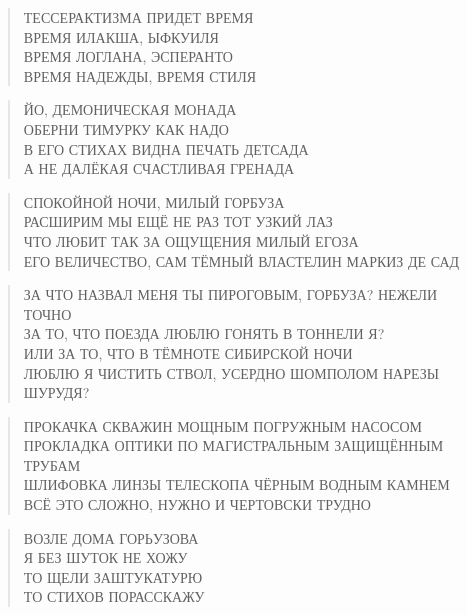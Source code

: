 \poemtitle{***}
\begin{verse}
ТЕССЕРАКТИЗМА ПРИДЕТ ВРЕМЯ\\
ВРЕМЯ ИЛАКША, ЫФКУИЛЯ\\
ВРЕМЯ ЛОГЛАНА, ЭСПЕРАНТО\\
ВРЕМЯ НАДЕЖДЫ, ВРЕМЯ СТИЛЯ
\end{verse}

\poemtitle{***}
\begin{verse}
ЙО, ДЕМОНИЧЕСКАЯ МОНАДА\\
ОБЕРНИ ТИМУРКУ КАК НАДО\\
В ЕГО СТИХАХ ВИДНА ПЕЧАТЬ ДЕТСАДА\\
А НЕ ДАЛЁКАЯ СЧАСТЛИВАЯ ГРЕНАДА
\end{verse}

\poemtitle{***}
\begin{verse}
СПОКОЙНОЙ НОЧИ, МИЛЫЙ ГОРБУЗА\\
РАСШИРИМ МЫ ЕЩЁ НЕ РАЗ ТОТ УЗКИЙ ЛАЗ\\
ЧТО ЛЮБИТ ТАК ЗА ОЩУЩЕНИЯ МИЛЫЙ ЕГОЗА\\
ЕГО ВЕЛИЧЕСТВО, САМ ТЁМНЫЙ ВЛАСТЕЛИН МАРКИЗ ДЕ САД
\end{verse}

\poemtitle{***}
\begin{verse}
ЗА ЧТО НАЗВАЛ МЕНЯ ТЫ ПИРОГОВЫМ, ГОРБУЗА? НЕЖЕЛИ ТОЧНО\\
ЗА ТО, ЧТО ПОЕЗДА ЛЮБЛЮ ГОНЯТЬ В ТОННЕЛИ Я?\\
ИЛИ ЗА ТО, ЧТО В ТЁМНОТЕ СИБИРСКОЙ НОЧИ\\
ЛЮБЛЮ Я ЧИСТИТЬ СТВОЛ, УСЕРДНО ШОМПОЛОМ НАРЕЗЫ ШУРУДЯ?
\end{verse}

\poemtitle{***}
\begin{verse}
ПРОКАЧКА СКВАЖИН МОЩНЫМ ПОГРУЖНЫМ НАСОСОМ\\
ПРОКЛАДКА ОПТИКИ ПО МАГИСТРАЛЬНЫМ ЗАЩИЩЁННЫМ ТРУБАМ\\
ШЛИФОВКА ЛИНЗЫ ТЕЛЕСКОПА ЧЁРНЫМ ВОДНЫМ КАМНЕМ\\
ВСЁ ЭТО СЛОЖНО, НУЖНО И ЧЕРТОВСКИ ТРУДНО
\end{verse}

\poemtitle{***}
\begin{verse}
ВОЗЛЕ ДОМА ГОРЬУЗОВА\\
Я БЕЗ ШУТОК НЕ ХОЖУ\\
ТО ЩЕЛИ ЗАШТУКАТУРЮ\\
ТО СТИХОВ ПОРАССКАЖУ
\end{verse}

